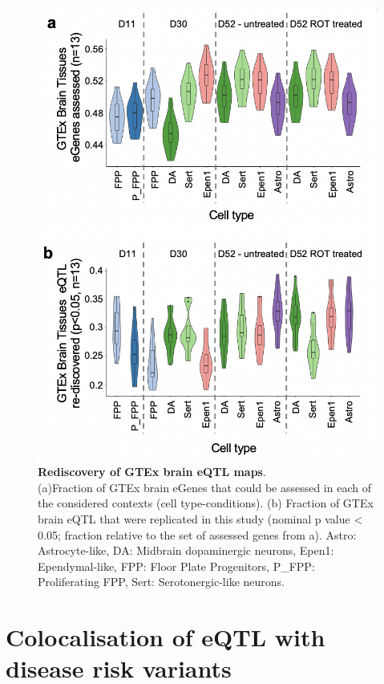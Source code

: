 \begin{figure}[h]
\centering
\includegraphics[width=13cm]{Chapter5/Fig/neuroseq_rediscovering_gtex_brain.png}
\caption[Rediscovery of GTEx brain eQTL maps]{\textbf{Rediscovery of GTEx brain eQTL maps}.\\
(a)Fraction of GTEx brain eGenes that could be assessed in each of the considered contexts (cell type-conditions). 
(b) Fraction of GTEx brain eQTL that were replicated in this study (nominal p value < 0.05; fraction relative to the set of assessed genes from a).
Astro: Astrocyte-like, DA: Midbrain dopaminergic neurons, Epen1: Ependymal-like, FPP: Floor Plate Progenitors, P\_FPP: Proliferating FPP, Sert: Serotonergic-like neurons.}
\label{fig:neuroseq_and_gtex_rediscovery}
\end{figure}

\clearpage

\section{Colocalisation of eQTL with disease risk variants}
\label{sec:neuroseq_coloc}

